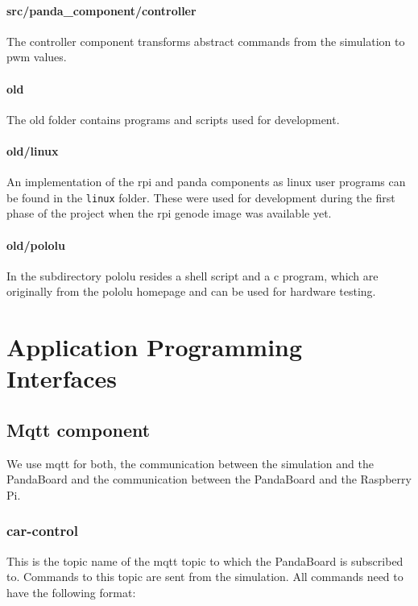 \paragraph{src/panda\_component/controller}
The controller component transforms abstract commands from the simulation to pwm values.

\paragraph{old}
The old folder contains programs and scripts used for development.

\paragraph{old/linux}
An implementation of the rpi and panda components as linux user programs can be found in the \texttt{linux} folder.
These were used for development during the first phase of the project when the rpi genode image was available yet.

\paragraph{old/pololu}
In the subdirectory pololu resides a shell script and a c program, which are originally from the pololu homepage and can be used for hardware testing.

\newpage
\section{Application Programming Interfaces}

\subsection{Mqtt component}
We use mqtt for both, the communication between the simulation and the PandaBoard and the communication between the PandaBoard and the Raspberry Pi.

\subsubsection{car-control}
This is the topic name of the mqtt topic to which the PandaBoard is subscribed to. Commands to this topic are sent from the simulation. All commands need to have the following format: \\

